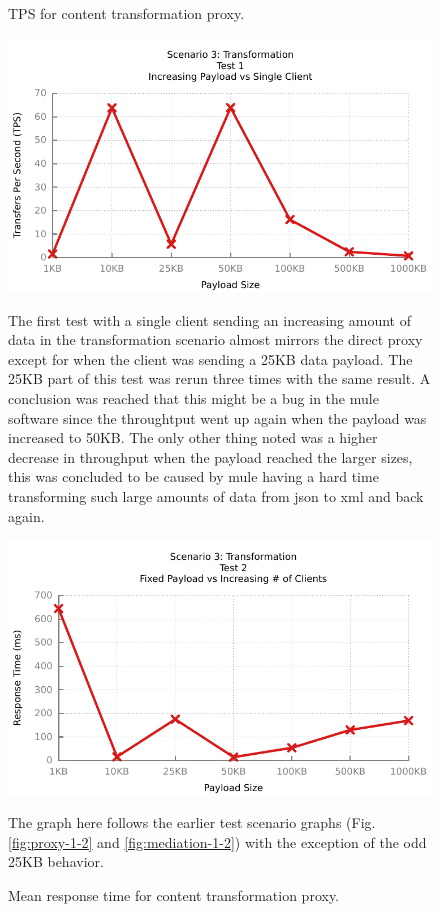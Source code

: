 \begin{figure}[H]
	\caption{TPS for content transformation proxy.}
	\centerline{\includegraphics{img/transform_fu_ip_tps}}
	\label{fig:transform-1-1}
	The first test with a single client sending an increasing amount of data in the transformation scenario almost mirrors the direct proxy except for when the client was sending a 25KB data payload. The 25KB part of this test was rerun three times with the same result.
	A conclusion was reached that this might be a bug in the mule software since the throughtput went up again when the payload was increased to 50KB.
	The only other thing noted was a higher decrease in throughput when the payload reached the larger sizes, this was concluded to be caused by mule having a hard time transforming such large amounts of data from json to xml and back again.

	\label{fig:transform-1-2}
	\caption{Mean response time for content transformation proxy.}
	\centerline{\includegraphics{img/transform_fu_ip_resp}}
	The graph here follows the earlier test scenario graphs (Fig. \ref{fig:proxy-1-2} and \ref{fig:mediation-1-2}) with the exception of the odd 25KB behavior.
\end{figure}

